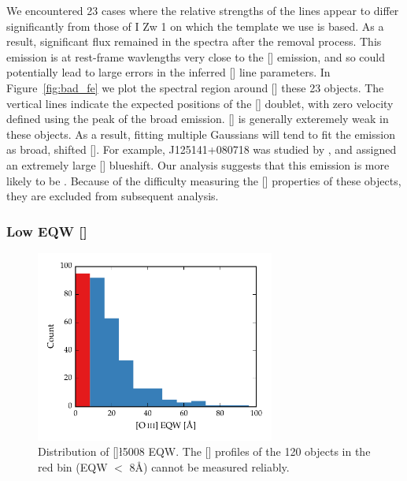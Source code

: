 We encountered 23 cases where the relative strengths of the  lines appear to differ significantly from those of I Zw 1 on which the  template we use is based. 
As a result, significant  flux remained in the spectra after the removal process. 
This emission is at rest-frame wavlengths very close to the [] emission, and so could potentially lead to large errors in the inferred [] line parameters. 
In Figure~\ref{fig:bad_fe} we plot the spectral region around [] these 23 objects.
The vertical lines indicate the expected positions of the [] doublet, with zero velocity defined using the peak of the broad \hb emission. 
[] is generally exteremely weak in these objects. 
As a result, fitting multiple Gaussians will tend to fit the  emission as broad, shifted []. 
For example, J125141+080718 was studied by \citet{shen16a}, and assigned an extremely large [] blueshift. 
Our analysis suggests that this emission is more likely to be . 
Because of the difficulty measuring the [] properties of these objects, they are excluded from subsequent analysis.  

\subsubsection{Low \ac{EQW} []}

\begin{figure}
    \centering
    \includegraphics[width=0.7\textwidth]{figures/chapter04/oiii_eqw_hist.pdf} 
    \caption{Distribution of []\l5008 \ac{EQW}. The [] profiles of the 120 objects in the red bin (\ac{EQW} $<$ 8\AA) cannot be measured reliably.}     
    \label{fig:oiii_strength_hist}
\end{figure}

